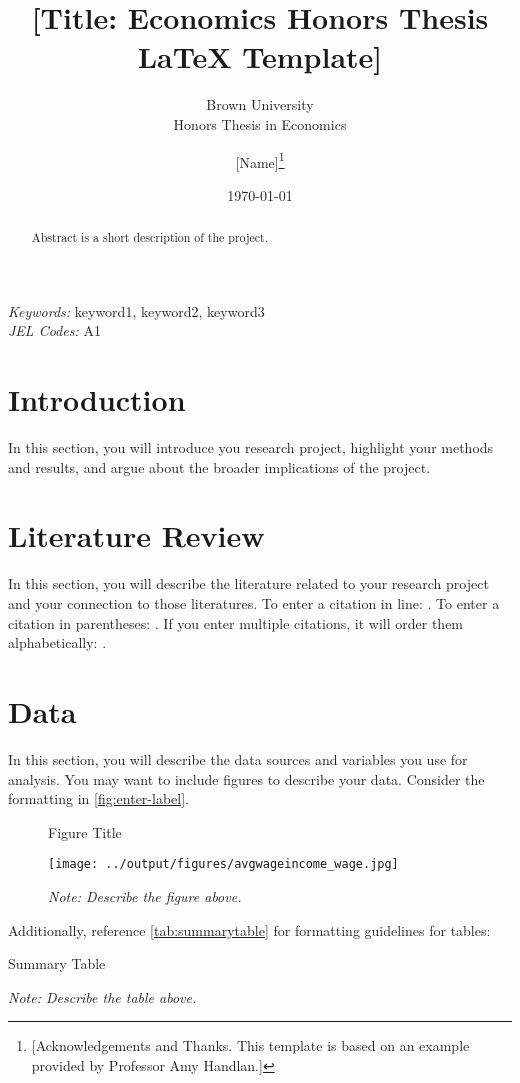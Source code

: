 \documentclass[12pt]{article}
\title{[Title: Economics Honors Thesis LaTeX Template]}
\subtitle{Brown University\\Honors Thesis in Economics}
\author{[Name]\thanks{[Acknowledgements and Thanks. This template is based on an example provided by Professor Amy Handlan.]}}
\date{\today}
\begin{document}
\maketitle

\begin{abstract}
    Abstract is a short description of the project.
\end{abstract} 
\doublespacing
\textit{Keywords:} keyword1, keyword2, keyword3
\\
\textit{JEL Codes:} A1 %
\newpage
{} 
 

\section{Introduction}
In this section, you will introduce you research project, highlight your methods and results, and argue about the broader implications of the project.

\section{Literature Review}
In this section, you will describe the literature related to your research project and your connection to those literatures. To enter a citation in line: \citet{wong2018breakdown}. To enter a citation in parentheses: \citep{CitationExample}. If you enter multiple citations, it will order them alphabetically: \citep{CitationExample,WorkingPaperExample}.

\section{Data}
In this section, you will describe the data sources and variables you use for analysis. You may want to include figures to describe your data. Consider the formatting in \autoref{fig:enter-label}.

\begin{figure}[ht]
    \centering
    \caption{Figure Title}
    \label{fig:enter-label}
    \texttt{[image: ../output/figures/avgwageincome\_wage.jpg]}
    \caption*{\footnotesize \textit{Note: Describe the figure above.}}
\end{figure}

Additionally, reference \autoref{tab:summarytable} for formatting guidelines for tables:

\begin{table}[ht]
    \centering
    \caption{Summary Table}
    \label{tab:summarytable}
    
    \caption*{\footnotesize \textit{Note: Describe the table above.}}
\end{table}
\end{document}
